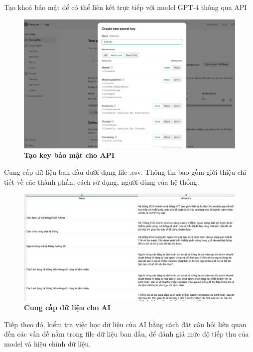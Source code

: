 Tạo khoá bảo mật để có thể liên kết trực tiếp với model GPT-4 thông qua API 

\begin{figure}[H]
  \centering
  \includegraphics[scale=0.4]{Images/server/ai/private-key.png}
  \caption[Tạo key bảo mật cho API]{\bfseries \fontsize{12pt}{0pt}
  \selectfont Tạo key bảo mật cho API}
  \label{create-ai-project} %
\end{figure}

Cung cấp dữ liệu ban đầu dưới dạng file .csv. Thông tin bao gồm giới thiệu chi tiết về các thành phần, cách sử dụng, người dùng của hệ thống.

\begin{figure}[H]
  \centering
  \includegraphics[scale=0.4]{Images/server/ai/training-ai.png}
  \caption[Cung cấp dữ liệu cho AI]{\bfseries \fontsize{12pt}{0pt}
  \selectfont Cung cấp dữ liệu cho AI}
  \label{create-ai-project} %
\end{figure}

Tiếp theo đó, kiểm tra việc học dữ liệu của AI bằng cách đặt câu hỏi liên quan đến các vấn đề nằm trong file dữ liệu ban đầu, để đánh giá mức độ tiếp thu của model và hiệu chỉnh dữ liệu.


